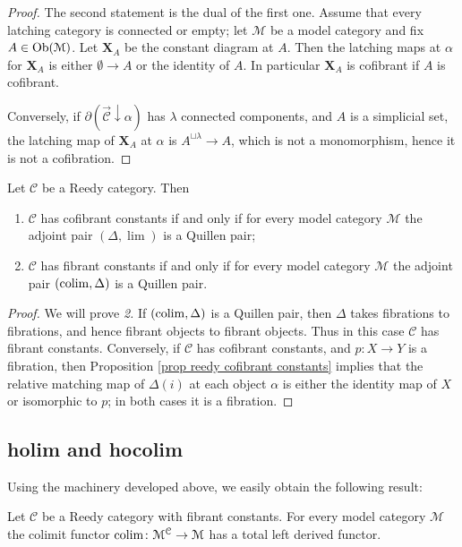 \begin{refsection}
\begin{proof}
The second statement is the dual of the first one. Assume that every latching category is connected or empty; let $\mathcal M$ be a model category and fix $A \in \operatorname{Ob}(\mathcal M)$. Let $\mathbf X_A$ be the constant diagram at $A$. Then the latching maps at $\alpha$ for $\mathbf X_A$ is either $\emptyset \to A$ or the identity of $A$. In particular $\mathbf X_A$ is cofibrant if $A$ is cofibrant.

Conversely, if $\partial (\overrightarrow{\mathcal C} \downarrow \alpha)$ has $\lambda$ connected components, and $A$ is a simplicial set, the latching map of $\mathbf X_A$ at $\alpha$ is $A^{\sqcup \lambda} \to A$, which is not a monomorphism, hence it is not a cofibration.
\end{proof}

\begin{cor} \label{cor reedy fibrant constants}
Let $\mathcal C$ be a Reedy category. Then
\begin{enumerate}
\item $\mathcal C$ has cofibrant constants if and only if for every model category $\mathcal M$ the adjoint pair $(\Delta, \lim)$ is a Quillen pair;
\item $\mathcal C$ has fibrant constants if and only if for every model category $\mathcal M$ the adjoint pair $(\operatorname*{colim}, \Delta)$ is a Quillen pair.
\end{enumerate}
\end{cor}

\begin{proof}
We will prove \emph{2.} If $(\operatorname*{colim}, \Delta)$ is a Quillen pair, then $\Delta$ takes fibrations to fibrations, and hence fibrant objects to fibrant objects. Thus in this case $\mathcal C$ has fibrant constants. Conversely, if $\mathcal C$ has cofibrant constants, and $p \colon X \to Y$ is a fibration, then Proposition \ref{prop reedy cofibrant constants} implies that the relative matching map of $\Delta(i)$ at each object $\alpha$ is either the identity map of $X$ or isomorphic to $p$; in both cases it is a fibration.
\end{proof}

\subsection{holim and hocolim}

Using the machinery developed above, we easily obtain the following result:

\begin{prop}
Let $\mathcal C$ be a Reedy category with fibrant constants. For every model category $\mathcal M$ the colimit functor $\operatorname*{colim} \colon \mathcal M^{\mathcal C} \to \mathcal M$ has a total left derived functor.
\end{prop}


\end{refsection}
